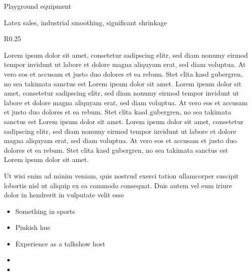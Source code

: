 \documentclass[master,english]{tithesisnotice}
\begin{document}
Playground equipment

Latex sales, industrial smoothing, significant shrinkage

\begin{wrapfigure}{R}{0.25\textwidth}
  \begin{center}
  \end{center}
\end{wrapfigure}
Lorem ipsum dolor sit amet, consetetur sadipscing elitr, sed diam nonumy eirmod
tempor invidunt ut labore et dolore magna aliquyam erat, sed diam voluptua. At
vero eos et accusam et justo duo dolores et ea rebum. Stet clita kasd
gubergren, no sea takimata sanctus est Lorem ipsum dolor sit amet. Lorem ipsum
dolor sit amet, consetetur sadipscing elitr, sed diam nonumy eirmod tempor
invidunt ut labore et dolore magna aliquyam erat, sed diam voluptua. At vero
eos et accusam et justo duo dolores et ea rebum. Stet clita kasd gubergren, no
sea takimata sanctus est Lorem ipsum dolor sit amet. Lorem ipsum dolor sit
amet, consetetur sadipscing elitr, sed diam nonumy eirmod tempor invidunt ut
labore et dolore magna aliquyam erat, sed diam voluptua. At vero eos et accusam
et justo duo dolores et ea rebum. Stet clita kasd gubergren, no sea takimata
sanctus est Lorem ipsum dolor sit amet.

Ut wisi enim ad minim veniam, quis nostrud exerci tation ullamcorper suscipit
lobortis nisl ut aliquip ex ea commodo consequat. Duis autem vel eum iriure
dolor in hendrerit in vulputate velit esse

\begin{itemize}
  \item Something in sports
  \item Pinkish hue
  \item Experience as a talkshow host
\end{itemize}

\begin{itemize}
  \item {}
  \item {}
\end{itemize}
\end{document}
